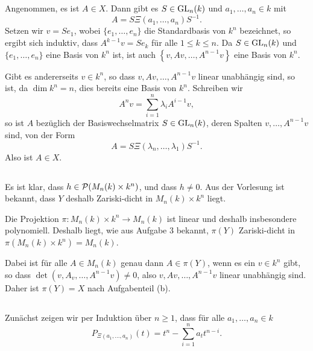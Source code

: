 \documentclass[a4paper,10pt]{article}
\begin{document}
\addtocounter{subsection}{1}
\subsection{}
Angenommen, es ist $A \in X$. Dann gibt es $S \in \operatorname{GL}_n(k)$ und $a_1, \ldots, a_n \in k$ mit
\[
 A = S \Xi(a_1, \ldots, a_n) S^{-1}.
\]
Setzen wir $v = Se_1$, wobei $\{e_1, \ldots, e_n\}$ die Standardbasis von $k^n$ bezeichnet, so ergibt sich induktiv, dass $A^{k-1} v = S e_k$ für alle $1 \leq k \leq n$. Da $S \in \operatorname{GL}_n(k)$ und $\{e_1, \ldots, e_n\}$ eine Basis von $k^n$ ist, ist auch $\left\{v, Av, \ldots, A^{n-1}v\right\}$ eine Basis von $k^n$.

Gibt es andererseits $v \in k^n$, so dass $v, Av, \ldots, A^{n-1}v$ linear unabhängig sind, so ist, da $\dim k^n = n$, dies bereits eine Basis von $k^n$. Schreiben wir
\[
 A^n v = \sum_{i=1}^n \lambda_i A^{i-1}v,
\]
so ist $A$ bezüglich der Basiswechselmatrix $S \in \operatorname{GL}_n(k)$, deren Spalten $v, \ldots, A^{n-1}v$ sind, von der Form
\[
 A = S \Xi(\lambda_n, \ldots, \lambda_1) S^{-1}.
\]
Also ist $A \in X$.


\subsection{}
Es ist klar, dass $h \in \mathcal{P}(M_n(k) \times k^n)$, und dass $h \neq 0$. Aus der Vorlesung ist bekannt, dass $Y$ deshalb Zariski-dicht in $M_n(k) \times k^n$ liegt.

Die Projektion $\pi : M_n(k) \times k^n \to M_n(k)$ ist linear und deshalb insbesondere polynomiell. Deshalb liegt, wie aus Aufgabe 3 bekannt, $\pi(Y)$ Zariski-dicht in $\pi(M_n(k) \times k^n) = M_n(k)$.

Dabei ist für alle $A \in M_n(k)$ genau dann $A \in \pi(Y)$, wenn es ein $v \in k^n$ gibt, so dass $\det(v, A_v, \ldots, A^{n-1}v) \neq 0$, also $v, Av, \ldots, A^{n-1}v$ linear unabhängig sind. Daher ist $\pi(Y) = X$ nach Aufgabenteil (b).


\subsection{}
Zunächst zeigen wir per Induktion über $n \geq 1$, dass für alle $a_1, \ldots, a_n \in k$
\[
 P_{\Xi(a_1, \ldots, a_n)}(t) = t^n - \sum_{i=1}^n a_t t^{n-i}.
\]
\end{document}
